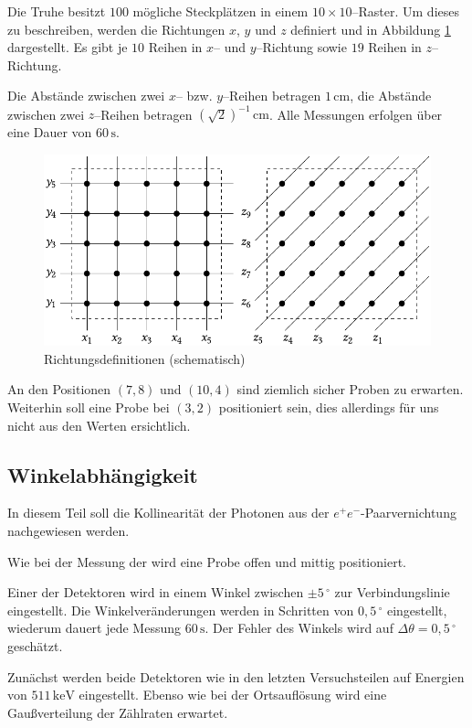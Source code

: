 \documentclass[12pt,a4paper]{scrartcl}
\numberwithin{equation}{section} %
\newcommand{\pu}[1]{\ensuremath{\mathrm{#1}}}
\begin{document}
Die Truhe besitzt $100$ mögliche Steckplätzen in einem $10\times10$--Raster. Um dieses zu beschreiben, werden die Richtungen $x$, $y$ und $z$ definiert und in Abbildung \ref{abb:TruheRichtungen} dargestellt. Es gibt je $10$ Reihen in $x$-- und $y$--Richtung sowie $19$ Reihen in $z$--Richtung.

Die Abstände zwischen zwei $x$-- bzw. $y$--Reihen betragen $\pu{1\,cm}$, die Abstände zwischen zwei $z$--Reihen betragen $(\sqrt{2})^{-1}\,\mathrm{cm}$. Alle Messungen erfolgen über eine Dauer von $60\,\mathrm{s}$.

\begin{figure}[h]
	\centering
	\includegraphics{../media/B3.4/Box_Axis.pdf}
	\caption{Richtungsdefinitionen (schematisch) \cite{UzK}}
	\label{abb:TruheRichtungen}
\end{figure}

An den Positionen $(7,8)$ und $(10,4)$ sind ziemlich sicher Proben zu erwarten. Weiterhin soll eine Probe bei $(3, 2)$ positioniert sein, dies allerdings für uns nicht aus den Werten ersichtlich.

\subsection{Winkelabhängigkeit}
In diesem Teil soll die Kollinearität der Photonen aus der $e^+e^-$-Paarvernichtung nachgewiesen werden.

Wie bei der Messung der  wird eine Probe offen und mittig positioniert.

Einer der Detektoren wird in einem Winkel zwischen $\pm 5\,^\circ$ zur Verbindungslinie eingestellt. Die Winkelveränderungen werden in Schritten von $0,5\,^\circ$ eingestellt, wiederum dauert jede Messung $60\,\mathrm{s}$. Der Fehler des Winkels wird auf $\Delta \theta = \pu{0,5\,^\circ}$ geschätzt.

Zunächst werden beide Detektoren wie in den letzten Versuchsteilen auf Energien von $\pu{511\,keV}$ eingestellt. Ebenso wie bei der Ortsauflösung wird eine Gaußverteilung der Zählraten erwartet.
\end{document}
